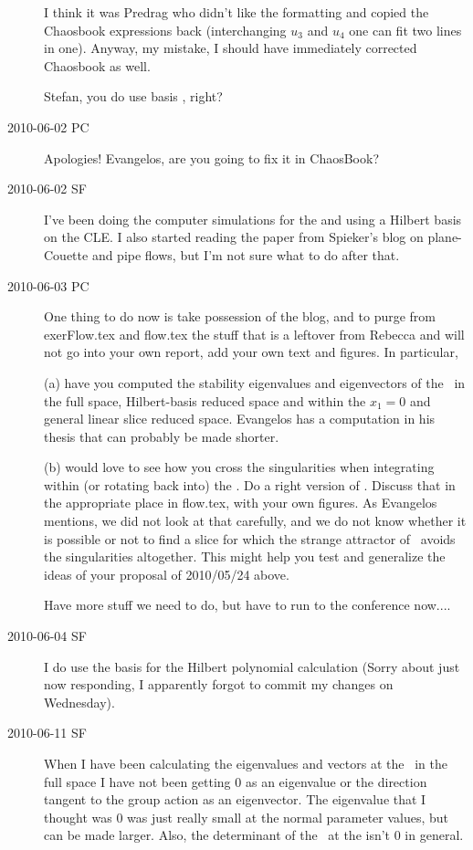\begin{description}
I think it was Predrag who didn't like the formatting and copied
the Chaosbook expressions back (interchanging $u_3$ and $u_4$ one
can fit two lines in one). Anyway, my mistake, I should have immediately
corrected Chaosbook as well.

Stefan, you do use basis , right?

\item[2010-06-02 PC] Apologies! Evangelos, are you going to fix it in ChaosBook?

\item[2010-06-02 SF]
I've been doing the computer simulations for the {\mslices}
and using a Hilbert basis on the CLE. I also started reading the paper from
Spieker's blog on plane-Couette and pipe flows, but I'm not sure what to do
after that.

\item[2010-06-03 PC]
One thing to do now is take possession of the blog,
and to purge from exerFlow.tex and flow.tex the stuff
that is a leftover from Rebecca and will not go into your own report,
add your own text and figures. In particular,

(a) have you computed the
stability eigenvalues and eigenvectors of the \reqv\ in
the full space, Hilbert-basis reduced space and within the $x_1=0$ and
general linear slice reduced space. Evangelos has a computation in his thesis
that can probably be made shorter.

(b) would love to see how you cross the singularities when integrating
within (or rotating back into) the \reducedsp. Do a right version
of . Discuss that in the appropriate
place in flow.tex, with your own figures. As Evangelos mentions, we
did not look at that carefully, and we do not know whether it is
possible or not to find a slice for which the strange attractor
of \cLe\ avoids the singularities altogether.
This might help you test and generalize the ideas
of your proposal of 2010/05/24 above.

Have more stuff we need to do, but have to run to the conference now....

\item[2010-06-04 SF]
I do use the basis  for the Hilbert polynomial calculation (Sorry about just now responding, I apparently forgot to commit my changes on Wednesday).

\item[2010-06-11 SF]
When I have been calculating the eigenvalues and vectors at the \reqv\ in the full space I have not been getting 0 as an eigenvalue or the direction tangent to the group action as an eigenvector. The eigenvalue that I thought was 0 was just really small at the normal parameter values, but can be made larger. Also, the determinant of the \stabmat\ at the {\reqv} isn't 0 in general.


\end{description}
